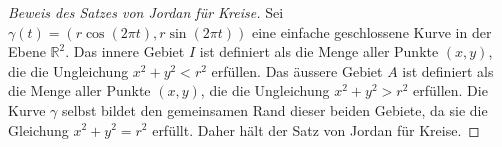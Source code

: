 \begin{proof}[Beweis des Satzes von Jordan für Kreise\label{jordan:beweis:jordan_kreis}]
    Sei $\gamma(t) = (r \cos(2\pi t), r \sin(2\pi t))$ eine einfache geschlossene Kurve in der Ebene $\mathbb{R}^2$. 
    Das innere Gebiet $I$ ist definiert als die Menge aller Punkte $(x,y)$, die die Ungleichung $x^2 + y^2 < r^2$ erfüllen. 
    Das äussere Gebiet $A$ ist definiert als die Menge aller Punkte $(x,y)$, die die Ungleichung $x^2 + y^2 > r^2$ erfüllen. 
    Die Kurve $\gamma$ selbst bildet den gemeinsamen Rand dieser beiden Gebiete, da sie die Gleichung $x^2 + y^2 = r^2$ erfüllt.    
    Daher hält der Satz von Jordan für Kreise.
\end{proof}